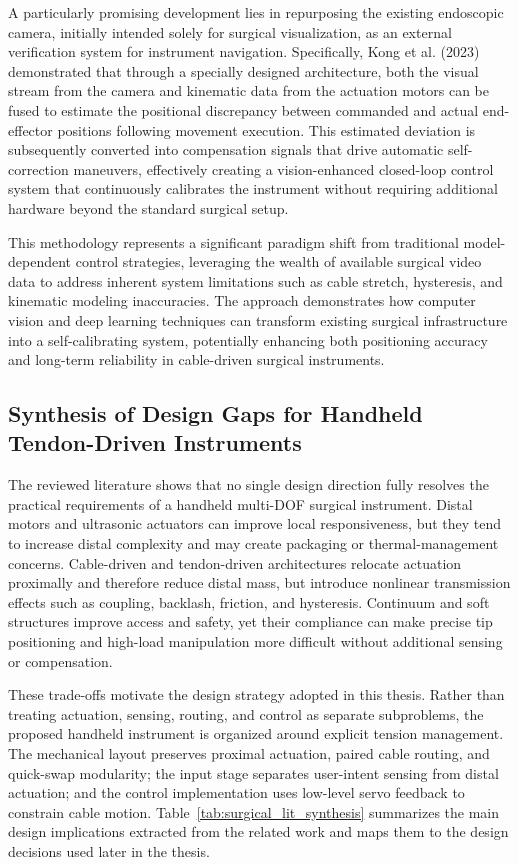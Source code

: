 A particularly promising development lies in repurposing the existing endoscopic camera, initially intended solely for surgical visualization, as an external verification system for instrument navigation. Specifically, Kong et al. (2023) demonstrated that through a specially designed architecture, both the visual stream from the camera and kinematic data from the actuation motors can be fused to estimate the positional discrepancy between commanded and actual end-effector positions following movement execution\cite{kong_automatic_2023}. This estimated deviation is subsequently converted into compensation signals that drive automatic self-correction maneuvers, effectively creating a vision-enhanced closed-loop control system that continuously calibrates the instrument without requiring additional hardware beyond the standard surgical setup.

This methodology represents a significant paradigm shift from traditional model-dependent control strategies, leveraging the wealth of available surgical video data to address inherent system limitations such as cable stretch, hysteresis, and kinematic modeling inaccuracies. The approach demonstrates how computer vision and deep learning techniques can transform existing surgical infrastructure into a self-calibrating system, potentially enhancing both positioning accuracy and long-term reliability in cable-driven surgical instruments.

\subsection{Synthesis of Design Gaps for Handheld Tendon-Driven Instruments}

The reviewed literature shows that no single design direction fully resolves the practical requirements of a handheld multi-DOF surgical instrument. Distal motors and ultrasonic actuators can improve local responsiveness, but they tend to increase distal complexity and may create packaging or thermal-management concerns. Cable-driven and tendon-driven architectures relocate actuation proximally and therefore reduce distal mass, but introduce nonlinear transmission effects such as coupling, backlash, friction, and hysteresis. Continuum and soft structures improve access and safety, yet their compliance can make precise tip positioning and high-load manipulation more difficult without additional sensing or compensation.

These trade-offs motivate the design strategy adopted in this thesis. Rather than treating actuation, sensing, routing, and control as separate subproblems, the proposed handheld instrument is organized around explicit tension management. The mechanical layout preserves proximal actuation, paired cable routing, and quick-swap modularity; the input stage separates user-intent sensing from distal actuation; and the control implementation uses low-level servo feedback to constrain cable motion. Table~\ref{tab:surgical_lit_synthesis} summarizes the main design implications extracted from the related work and maps them to the design decisions used later in the thesis.

